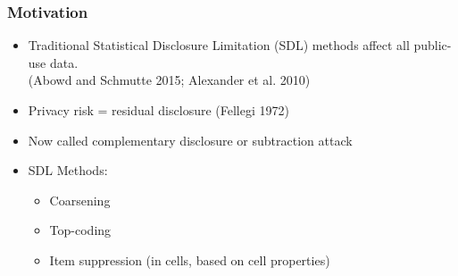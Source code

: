 \begin{frame}[allowframebreaks]%
\frametitle{Motivation}

\begin{itemize}
	\item Traditional Statistical Disclosure Limitation (SDL) methods affect all public-use data. \\(Abowd and Schmutte 2015; Alexander et al. 2010) \vspace{.25in}
	\item Privacy risk = residual disclosure (Fellegi 1972)
    \item Now called complementary disclosure or subtraction attack \vspace{.25in}
	\item SDL Methods:
	\begin{itemize}
		\item Coarsening
		\item Top-coding
		\item Item suppression (in cells, based on cell properties)
	\end{itemize}

\end{itemize}



\end{frame}%
%

